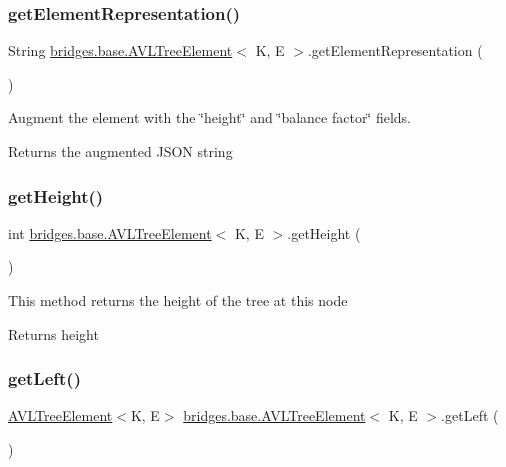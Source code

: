 \subsubsection{\texorpdfstring{getElementRepresentation()}{getElementRepresentation()}}
{\footnotesize\ttfamily String \mbox{\hyperlink{classbridges_1_1base_1_1_a_v_l_tree_element}{bridges.\+base.\+A\+V\+L\+Tree\+Element}}$<$ K, E $>$.get\+Element\+Representation (\begin{DoxyParamCaption}{ }\end{DoxyParamCaption})}

Augment the element with the \char`\"{}height\char`\"{} and \char`\"{}balance factor\char`\"{} fields.

\begin{DoxyReturn}{Returns}
the augmented J\+S\+ON string 
\end{DoxyReturn}
\mbox{\label{classbridges_1_1base_1_1_a_v_l_tree_element_a52fe2886334c841547d238db69022697}} 
\subsubsection{\texorpdfstring{getHeight()}{getHeight()}}
{\footnotesize\ttfamily int \mbox{\hyperlink{classbridges_1_1base_1_1_a_v_l_tree_element}{bridges.\+base.\+A\+V\+L\+Tree\+Element}}$<$ K, E $>$.get\+Height (\begin{DoxyParamCaption}{ }\end{DoxyParamCaption})}

This method returns the height of the tree at this node

\begin{DoxyReturn}{Returns}
height 
\end{DoxyReturn}
\mbox{\label{classbridges_1_1base_1_1_a_v_l_tree_element_a86f1329b19d2886ba7bf713e3844ecd6}} 
\subsubsection{\texorpdfstring{getLeft()}{getLeft()}}
{\footnotesize\ttfamily \mbox{\hyperlink{classbridges_1_1base_1_1_a_v_l_tree_element}{A\+V\+L\+Tree\+Element}}$<$K, E$>$ \mbox{\hyperlink{classbridges_1_1base_1_1_a_v_l_tree_element}{bridges.\+base.\+A\+V\+L\+Tree\+Element}}$<$ K, E $>$.get\+Left (\begin{DoxyParamCaption}{ }\end{DoxyParamCaption})}

